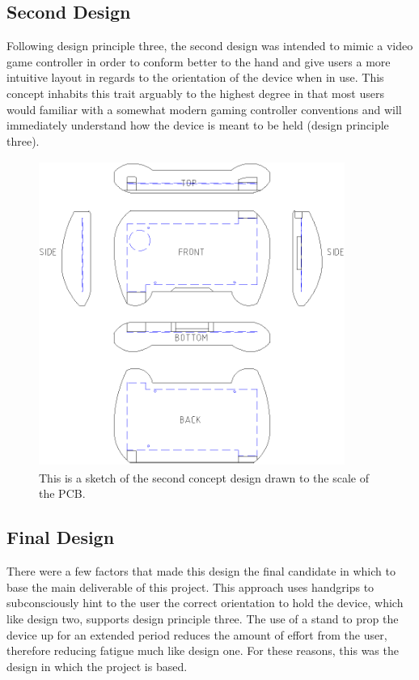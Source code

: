 \subsection{Second Design}

Following design principle three, the second design was intended to mimic a video game controller in order to conform better to the hand and give users a more intuitive layout in regards to the orientation of the device when in use. 
This concept inhabits this trait arguably to the highest degree in that most users would familiar with a somewhat modern gaming controller conventions and will immediately understand how the device is meant to be held (design principle three).

\begin{figure} [h]
\centering
\includegraphics[width=10cm,height=10cm,keepaspectratio]{Figures/design2_sketch.png}
\caption{This is a sketch of the second concept design drawn to the scale of the PCB.}
\label{fig:Design_2}
\end{figure}

\subsection{Final Design}

There were a few factors that made this design the final candidate in which to base the main deliverable of this project.
This approach uses handgrips to subconsciously hint to the user the correct orientation to hold the device, which like design two, supports design principle three.
The use of a stand to prop the device up for an extended period reduces the amount of effort from the user, therefore reducing fatigue much like design one.
For these reasons, this was the design in which the project is based.

